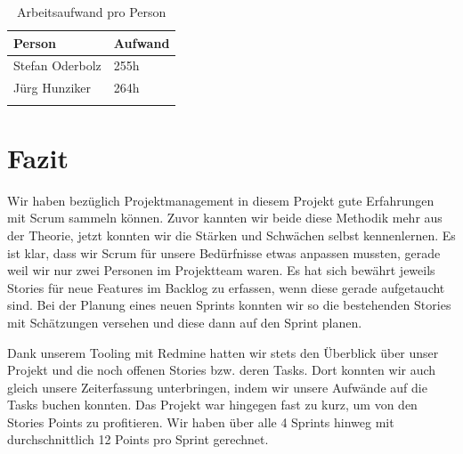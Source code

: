 \begin{longtable}{|l|l|}
\hline 
\textbf{Person} & \textbf{Aufwand} \\ 
\hline 
Stefan Oderbolz & 255h \\ 
\hline 
Jürg Hunziker & 264h \\ 
\hline 
\caption{Arbeitsaufwand pro Person}
\label{projektmanagement-arbeitsaufwand}
\end{longtable} 

\section{Fazit}
Wir haben bezüglich Projektmanagement in diesem Projekt gute Erfahrungen mit Scrum sammeln können. Zuvor kannten wir beide diese Methodik mehr aus der Theorie, jetzt konnten wir die Stärken und Schwächen selbst kennenlernen. Es ist klar, dass wir Scrum für unsere Bedürfnisse etwas anpassen mussten, gerade weil wir nur zwei Personen im Projektteam waren. Es hat sich bewährt jeweils Stories für neue Features im Backlog zu erfassen, wenn diese gerade aufgetaucht sind. Bei der Planung eines neuen Sprints konnten wir so die bestehenden Stories mit Schätzungen versehen und diese dann auf den Sprint planen.

Dank unserem Tooling mit Redmine hatten wir stets den Überblick über unser Projekt und die noch offenen Stories bzw. deren Tasks. Dort konnten wir auch gleich unsere Zeiterfassung unterbringen, indem wir unsere Aufwände auf die Tasks buchen konnten. Das Projekt war hingegen fast zu kurz, um von den Stories Points zu profitieren. Wir haben über alle 4 Sprints hinweg mit durchschnittlich 12 Points pro Sprint gerechnet.